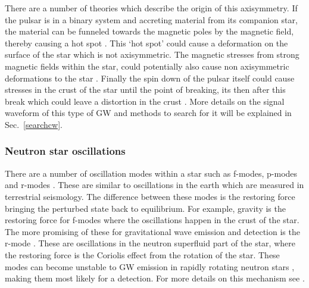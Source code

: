 There are a number of theories which describe the origin of this axisymmetry.
If the pulsar is in a binary system and accreting material from its companion star, the material can be funneled towards the magnetic poles by the magnetic field, thereby causing a hot spot \citep{haskell2015DetectingGravitational}.
This `hot spot' could cause a deformation on the surface of the star which is not axisymmetric. 
The magnetic stresses from strong magnetic fields within the star, could potentially also cause non axisymmetric deformations to the star \citep{}.
Finally the spin down of the pulsar itself could cause stresses in the crust of the star until the point of breaking, its then after this break which could leave a distortion in the crust \citep{becker2009NeutronStars}.
More details on the signal waveform of this type of \gls{GW} and methods to search for it will be explained in Sec.~\ref{searchcw}.
 
 \subsubsection{Neutron star oscillations}
There are a number of oscillation modes within a star such as f-modes, p-modes and r-modes \citep{becker2009NeutronStars}. 
These are similar to oscillations in the earth which are measured in terrestrial seismology.
The difference between these modes is the restoring force bringing the perturbed state back to equilibrium.
For example, gravity is the restoring force for f-modes where the oscillations happen in the crust of the star.
The more promising of these for gravitational wave emission and detection is the r-mode \citep{lasky2015GravitationalWaves}. 
These are oscillations in the neutron superfluid part of the star, where the restoring force is the Coriolis effect from the rotation of the star.
These modes can become unstable to \gls{GW} emission in rapidly rotating neutron stars \citep{lasky2015GravitationalWaves}, making them most likely for a detection.
For more details on this mechanism see \citep{lasky2015GravitationalWaves,owen1998GravitationalWaves,jonesCFSInstability}.

